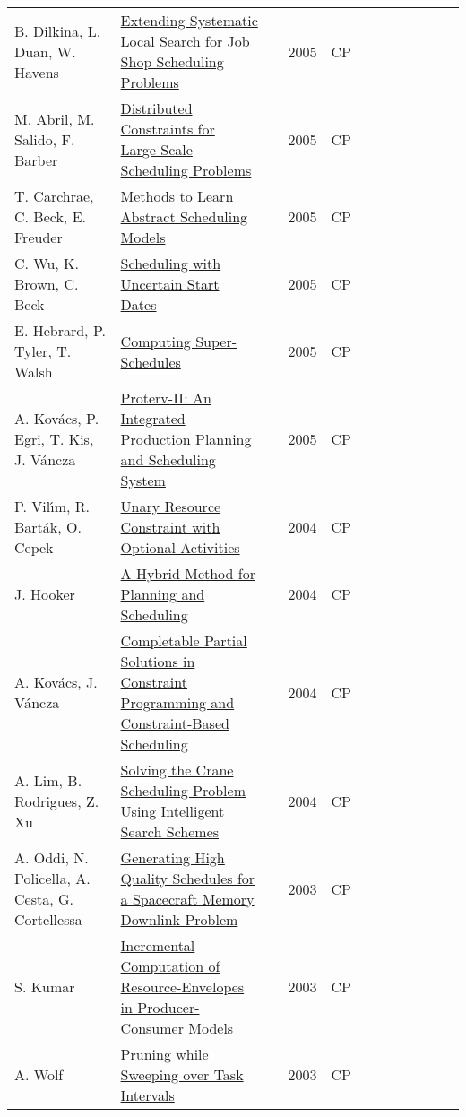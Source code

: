 {\begin{longtable}{p{3cm}p{6cm}rrcrlcccp{1.5cm}l}
B. Dilkina, L. Duan, W. Havens& \href{papers/DilkinaDH05.pdf}{Extending Systematic Local Search for Job Shop Scheduling Problems} & \cite{DilkinaDH05} & 2005 & CP & & & & & & & \\
M. Abril, M. Salido, F. Barber& \href{papers/AbrilSB05.pdf}{Distributed Constraints for Large-Scale Scheduling Problems} & \cite{AbrilSB05} & 2005 & CP & & & & & & & \\
T. Carchrae, C. Beck, E. Freuder& \href{papers/CarchraeBF05.pdf}{Methods to Learn Abstract Scheduling Models} & \cite{CarchraeBF05} & 2005 & CP & & & & & & & \\
C. Wu, K. Brown, C. Beck& \href{papers/WuBB05.pdf}{Scheduling with Uncertain Start Dates} & \cite{WuBB05} & 2005 & CP & & & & & & & \\
E. Hebrard, P. Tyler, T. Walsh& \href{papers/HebrardTW05.pdf}{Computing Super-Schedules} & \cite{HebrardTW05} & 2005 & CP & & & & & & & \\
A. Kov{\'{a}}cs, P. Egri, T. Kis, J. V{\'{a}}ncza& \href{papers/KovacsEKV05.pdf}{Proterv-II: An Integrated Production Planning and Scheduling System} & \cite{KovacsEKV05} & 2005 & CP & & & & & & & \\
P. Vil{\'{\i}}m, R. Bart{\'{a}}k, O. Cepek& \href{papers/VilimBC04.pdf}{Unary Resource Constraint with Optional Activities} & \cite{VilimBC04} & 2004 & CP & & & & & & & \\
J. Hooker & \href{papers/Hooker04.pdf}{A Hybrid Method for Planning and Scheduling} & \cite{Hooker04} & 2004 & CP & & & & & & & \\
A. Kov{\'{a}}cs, J. V{\'{a}}ncza& \href{papers/KovacsV04.pdf}{Completable Partial Solutions in Constraint Programming and Constraint-Based Scheduling} & \cite{KovacsV04} & 2004 & CP & & & & & & & \\
A. Lim, B. Rodrigues, Z. Xu& \href{papers/LimRX04.pdf}{Solving the Crane Scheduling Problem Using Intelligent Search Schemes} & \cite{LimRX04} & 2004 & CP & & & & & & & \\
A. Oddi, N. Policella, A. Cesta, G. Cortellessa& \href{papers/OddiPCC03.pdf}{Generating High Quality Schedules for a Spacecraft Memory Downlink Problem} & \cite{OddiPCC03} & 2003 & CP & & & & & & & \\
S. Kumar & \href{papers/Kumar03.pdf}{Incremental Computation of Resource-Envelopes in Producer-Consumer Models} & \cite{Kumar03} & 2003 & CP & & & & & & & \\
A. Wolf & \href{papers/Wolf03.pdf}{Pruning while Sweeping over Task Intervals} & \cite{Wolf03} & 2003 & CP & & & & & & & \\

\end{longtable}}
